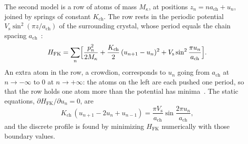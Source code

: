 The second model is a row of atoms of mass $M_\kappa$, at positions $z_n = na_{\mathrm{ch}} + u_n$, joined by springs of constant $K_{\mathrm{ch}}$. The row rests in the periodic potential $V_{\mathrm{s}}\sin^2(\pi z/a_{\mathrm{ch}})$ of the surrounding crystal, whose period equals the chain spacing $a_{\mathrm{ch}}$~\cite{braun2004frenkel}:
\begin{equation}
  H_{\mathrm{FK}} = \sum_n\Bigl[\frac{p_n^2}{2M_\kappa} + \frac{K_{\mathrm{ch}}}{2}\,(u_{n+1} - u_n)^2 + V_{\mathrm{s}}\sin^2\frac{\pi u_n}{a_{\mathrm{ch}}}\Bigr] .
  \label{eq:C.20-FK}
\end{equation}
An extra atom in the row, a crowdion, corresponds to $u_n$ going from $a_{\mathrm{ch}}$ at $n \to -\infty$ to 0 at $n \to +\infty$: the atoms on the left are each pushed one period, so that the row holds one atom more than the potential has minima~\cite{fitzgerald2018structure}. The static equations, $\partial H_{\mathrm{FK}}/\partial u_n = 0$, are
\begin{equation}
  K_{\mathrm{ch}}\,(u_{n+1} - 2u_n + u_{n-1}) = \frac{\pi V_{\mathrm{s}}}{a_{\mathrm{ch}}}\sin\frac{2\pi u_n}{a_{\mathrm{ch}}} ,
  \label{eq:C.20-discrete}
\end{equation}
and the discrete profile is found by minimizing $H_{\mathrm{FK}}$ numerically with those boundary values.

